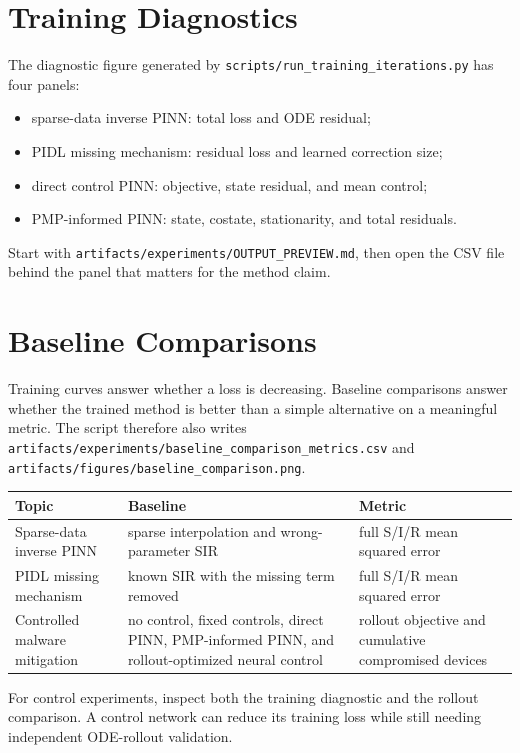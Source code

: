 \documentclass[11pt,a4paper]{article}
\begin{document}
\section{Training Diagnostics}
The diagnostic figure generated by \texttt{scripts/run\_training\_iterations.py} has four panels:
\begin{itemize}
\item sparse-data inverse PINN: total loss and ODE residual;
\item PIDL missing mechanism: residual loss and learned correction size;
\item direct control PINN: objective, state residual, and mean control;
\item PMP-informed PINN: state, costate, stationarity, and total residuals.
\end{itemize}
Start with \texttt{artifacts/experiments/OUTPUT\_PREVIEW.md}, then open the CSV file behind the panel that matters for the method claim.

\section{Baseline Comparisons}
Training curves answer whether a loss is decreasing. Baseline comparisons answer whether the trained method is better than a simple alternative on a meaningful metric. The script therefore also writes \texttt{artifacts/experiments/baseline\_comparison\_metrics.csv} and \texttt{artifacts/figures/baseline\_comparison.png}.

\begin{longtable}{p{}p{}p{}}
\toprule
Topic & Baseline & Metric \\
\midrule
Sparse-data inverse PINN & sparse interpolation and wrong-parameter SIR & full S/I/R mean squared error \\
PIDL missing mechanism & known SIR with the missing term removed & full S/I/R mean squared error \\
Controlled malware mitigation & no control, fixed controls, direct PINN, PMP-informed PINN, and rollout-optimized neural control & rollout objective and cumulative compromised devices \\
\bottomrule
\end{longtable}

For control experiments, inspect both the training diagnostic and the rollout comparison. A control network can reduce its training loss while still needing independent ODE-rollout validation.
\end{document}
